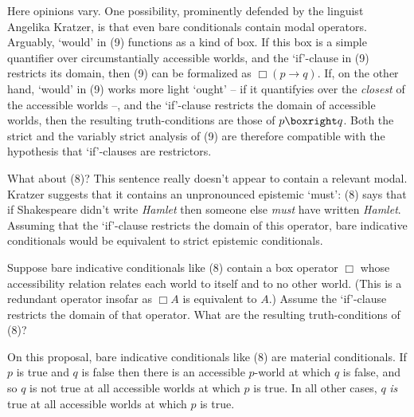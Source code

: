 Here opinions vary. One possibility, prominently defended by the linguist
Angelika Kratzer, is that even bare conditionals contain modal operators.
Arguably, `would' in (9) functions as a kind of box. If this box is a simple
quantifier over circumstantially accessible worlds, and the `if'-clause in (9)
restricts its domain, then (9) can be formalized as $\Box(p \to q)$. If, on the
other hand, `would' in (9) works more light `ought' -- if it quantifyies over the
\emph{closest} of the accessible worlds --, and the `if'-clause restricts the
domain of accessible worlds, then the resulting truth-conditions are those of
$p \boxright q$. Both the strict and the variably strict analysis of (9) are
therefore compatible with the hypothesis that `if'-clauses are restrictors.

What about (8)? This sentence really doesn't appear to contain a relevant modal.
Kratzer suggests that it contains an unpronounced epistemic `must': (8) says
that if Shakespeare didn't write \emph{Hamlet} then someone else \emph{must}
have written \emph{Hamlet}. Assuming that the `if'-clause restricts the domain
of this operator, bare indicative conditionals would be equivalent to
strict epistemic conditionals.

\begin{exercise}
  Suppose bare indicative conditionals like (8) contain a box operator $\Box$
  whose accessibility relation relates each world to itself and to no other
  world. (This is a redundant operator insofar as $\Box A$ is equivalent to $A$.)
  Assume the `if'-clause restricts the domain of that operator. What are the
  resulting truth-conditions of (8)?
\end{exercise}
\begin{solution}
  On this proposal, bare indicative conditionals like (8) are material
  conditionals. If $p$ is true and $q$ is false then there is an accessible
  $p$-world at which $q$ is false, and so $q$ is not true at all accessible
  worlds at which $p$ is true. In all other cases, $q$ \emph{is} true at all
  accessible worlds at which $p$ is true.
\end{solution}

